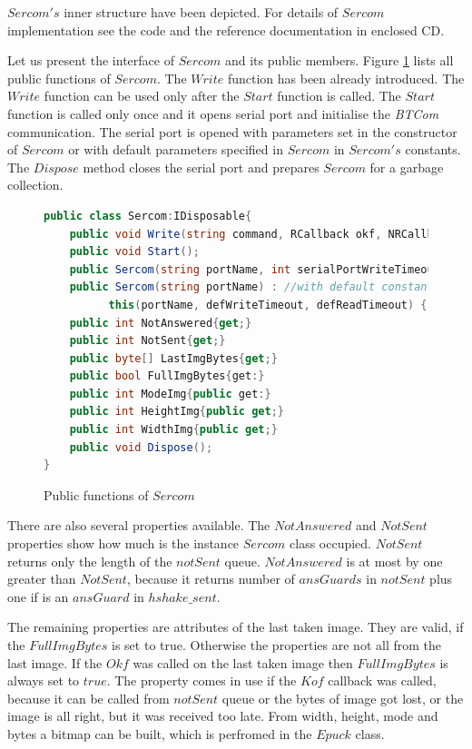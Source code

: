 \documentclass[12pt,notitlepage]{report}
\begin{document}
	
	$Sercom's$ inner structure have been depicted. For details of 
	$Sercom$ implementation see the code and the reference documentation in enclosed CD.

	Let  us present the interface of $Sercom$ and its public members.
	Figure \ref{publicser} lists all public functions of $Sercom$.
	The $Write$ function has been already introduced. The $Write$ function can be used only
	after the $Start$ function is called. The $Start$ function is called only once and
	it opens serial port and initialise the {\it BTCom} communication. 
	The serial port is opened with parameters set in the constructor of $Sercom$ or with
	default parameters specified in $Sercom$ in $Sercom's$ constants. The $Dispose$ method closes the serial port
	and prepares $Sercom$ for a garbage collection.

\begin{figure}[!hbp]
\begin{lstlisting}[language=cs]
public class Sercom:IDisposable{
	public void Write(string command, RCallback okf, NRCallback kof,object state, double timeout);
	public void Start();
	public Sercom(string portName, int serialPortWriteTimeout, int serialPortReadTimeout);
	public Sercom(string portName) : //with default constants
	      this(portName, defWriteTimeout, defReadTimeout) { }
	public int NotAnswered{get;}
	public int NotSent{get;}
	public byte[] LastImgBytes{get;}
	public bool FullImgBytes{get:}
	public int ModeImg{public get:}
	public int HeightImg{public get;}
	public int WidthImg{public get;}
	public void Dispose();
}
\end{lstlisting}
\caption{Public functions of $Sercom$} \label{publicser}	
\end{figure}

	There are also several properties available. The $NotAnswered$ and $NotSent$ properties
	show how much is the instance $Sercom$ class occupied. $NotSent$ returns only the length of the $notSent$ queue. 
	$NotAnswered$ is at most by one greater than $NotSent$,
	because it returns number of $ansGuards$ in $notSent$ plus one if is an $ansGuard$ in $hshake\_sent$.

	The remaining properties are attributes of the last taken image. They are valid, if the $FullImgBytes$ is set to true.
	Otherwise the properties are not all from the last image.
	If the $Okf$ was called on the last taken image then $FullImgBytes$ is always set to $true$. The property
	comes in use if the $Kof$ callback was called, because it can be called from $notSent$ queue 
	or the bytes of image got lost, or the image is all right, but it was received too late. 
	From width, height, mode and bytes a bitmap can be built, which is perfromed
	in the $Epuck$ class.
\end{document}

